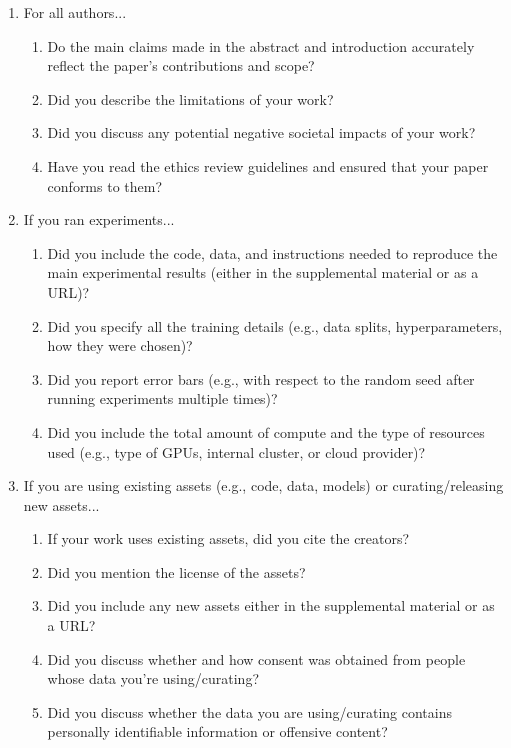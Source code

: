 \documentclass{article}
\begin{document}
\begin{enumerate}

\item For all authors...
\begin{enumerate}
  \item Do the main claims made in the abstract and introduction accurately reflect the paper's contributions and scope?
    \answerYes{}
  \item Did you describe the limitations of your work?
    \answerYes{}
  \item Did you discuss any potential negative societal impacts of your work?
    \answerNA{}
  \item Have you read the ethics review guidelines and ensured that your paper conforms to them?
\end{enumerate}

\item If you ran experiments...
\begin{enumerate}
  \item Did you include the code, data, and instructions needed to reproduce the main experimental results (either in the supplemental material or as a URL)?
  \item Did you specify all the training details (e.g., data splits, hyperparameters, how they were chosen)?
	\item Did you report error bars (e.g., with respect to the random seed after running experiments multiple times)?
    \answerNA{}{}
	\item Did you include the total amount of compute and the type of resources used (e.g., type of GPUs, internal cluster, or cloud provider)?
    \answerNA{}
\end{enumerate}

\item If you are using existing assets (e.g., code, data, models) or curating/releasing new assets...
\begin{enumerate}
  \item If your work uses existing assets, did you cite the creators?
  \item Did you mention the license of the assets?
  \item Did you include any new assets either in the supplemental material or as a URL?
  \item Did you discuss whether and how consent was obtained from people whose data you're using/curating?
    \answerNA{}
  \item Did you discuss whether the data you are using/curating contains personally identifiable information or offensive content?
    \answerNA{}
\end{enumerate}

\end{enumerate}
\newpage

\end{document}
